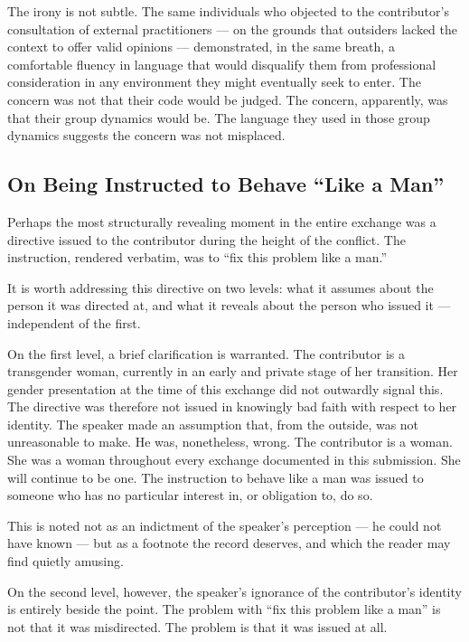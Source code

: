 \documentclass[11pt,a4paper]{book}
\begin{document}
The irony is not subtle. The same individuals who objected to the contributor's consultation of external practitioners --- on the grounds that outsiders lacked the context to offer valid opinions --- demonstrated, in the same breath, a comfortable fluency in language that would disqualify them from professional consideration in any environment they might eventually seek to enter. The concern was not that their code would be judged. The concern, apparently, was that their group dynamics would be. The language they used in those group dynamics suggests the concern was not misplaced.

\subsection{On Being Instructed to Behave ``Like a Man''}

Perhaps the most structurally revealing moment in the entire exchange was a directive issued to the contributor during the height of the conflict. The instruction, rendered verbatim, was to ``fix this problem like a man.''

It is worth addressing this directive on two levels: what it assumes about the person it was directed at, and what it reveals about the person who issued it --- independent of the first.

On the first level, a brief clarification is warranted. The contributor is a transgender woman, currently in an early and private stage of her transition. Her gender presentation at the time of this exchange did not outwardly signal this. The directive was therefore not issued in knowingly bad faith with respect to her identity. The speaker made an assumption that, from the outside, was not unreasonable to make. He was, nonetheless, wrong. The contributor is a woman. She was a woman throughout every exchange documented in this submission. She will continue to be one. The instruction to behave like a man was issued to someone who has no particular interest in, or obligation to, do so.

This is noted not as an indictment of the speaker's perception --- he could not have known --- but as a footnote the record deserves, and which the reader may find quietly amusing.

On the second level, however, the speaker's ignorance of the contributor's identity is entirely beside the point. The problem with ``fix this problem like a man'' is not that it was misdirected. The problem is that it was issued at all.
\end{document}
